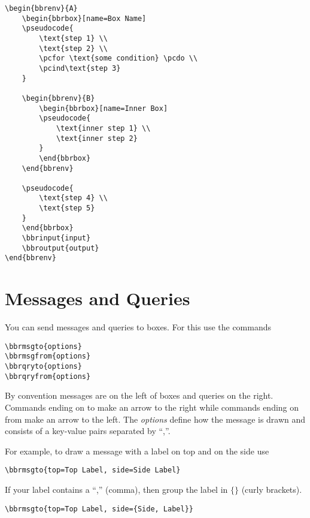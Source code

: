 \documentclass[a4paper]{report}
\begin{document}
\begin{lstlisting}
\begin{bbrenv}{A}
	\begin{bbrbox}[name=Box Name]
	\pseudocode{
		\text{step 1} \\
		\text{step 2} \\
		\pcfor \text{some condition} \pcdo \\
		\pcind\text{step 3}
	}

	\begin{bbrenv}{B}
		\begin{bbrbox}[name=Inner Box]
		\pseudocode{
			\text{inner step 1} \\
			\text{inner step 2}
		}
		\end{bbrbox}
	\end{bbrenv}

	\pseudocode{
		\text{step 4} \\
		\text{step 5}
	}
	\end{bbrbox}
	\bbrinput{input}
	\bbroutput{output}
\end{bbrenv}
\end{lstlisting}

\section{Messages and Queries}

You can send messages and queries to boxes. For this use the commands
\begin{lstlisting}
\bbrmsgto{options}
\bbrmsgfrom{options}
\bbrqryto{options}
\bbrqryfrom{options}
\end{lstlisting}
By convention messages are on the left of boxes and queries on the right. Commands ending on to
make an arrow to the right while commands ending on from make an arrow to the left. The \emph{options}
define how the message is drawn and consists of a key-value pairs separated by \enquote{,}.

For example, to draw a message with a label on top and on the side use
\begin{lstlisting}
\bbrmsgto{top=Top Label, side=Side Label}
\end{lstlisting}
If your label contains a \enquote{,} (comma), then group the label in $\{\}$ (curly brackets).
\begin{lstlisting}
\bbrmsgto{top=Top Label, side={Side, Label}}
\end{lstlisting}
\end{document}
